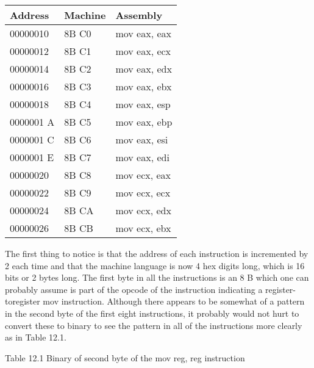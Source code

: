 \documentclass[10pt]{article}
\begin{document}
\begin{center}
\begin{tabular}{|l|l|l|}
\hline
Address & Machine & Assembly \\
\hline
00000010 & 8B C0 & mov eax, eax \\
\hline
00000012 & 8B C1 & mov eax, ecx \\
\hline
00000014 & 8B C2 & mov eax, edx \\
\hline
00000016 & 8B C3 & mov eax, ebx \\
\hline
00000018 & 8B C4 & mov eax, esp \\
\hline
0000001 A & 8B C5 & mov eax, ebp \\
\hline
0000001 C & 8B C6 & mov eax, esi \\
\hline
0000001 E & 8B C7 & mov eax, edi \\
\hline
00000020 & 8B C8 & mov ecx, eax \\
\hline
00000022 & 8B C9 & mov ecx, ecx \\
\hline
00000024 & 8B CA & mov ecx, edx \\
\hline
00000026 & 8B CB & mov ecx, ebx \\
\hline
\end{tabular}
\end{center}

The first thing to notice is that the address of each instruction is incremented by 2 each time and that the machine language is now 4 hex digits long, which is 16 bits or 2 bytes long. The first byte in all the instructions is an 8 B which one can probably assume is part of the opcode of the instruction indicating a register-toregister mov instruction. Although there appears to be somewhat of a pattern in the second byte of the first eight instructions, it probably would not hurt to convert these to binary to see the pattern in all of the instructions more clearly as in Table 12.1.

Table 12.1 Binary of second byte of the mov reg, reg instruction
\end{document}
